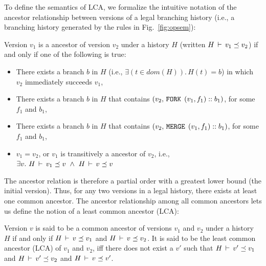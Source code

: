 To define the semantics of LCA, we formalize the intuitive notation of
the ancestor relationship between versions of a legal branching
history (i.e., a branching history generated by the rules in
Fig.~\ref{fig:opsem}):

\begin{definition} 
Version $v_1$ is a ancestor of version $v_2$ under a history
$H$ (written $H\,\vdash\,v_1 \preceq v_2$) if and only if one of the
following is true:
\begin{itemize}
  \item There exists a branch $b$ in $H$ (i.e., $\exists(t\in
  dom(H)).\,H(t) = b$) in which $v_2$ immediately succeeds
  $v_1$,
  \item There exists a branch $b$ in $H$ that contains $(v_2, 
  \,{\tt FORK}\,\; (v_1,f_1)::b_1)$, for some $f_1$ and $b_1$,
  \item There exists a branch $b$ in $H$ that contains
  $(v_2, \,{\tt MERGE}\,\;(v_1,f_1)::b_1)$, for some $f_1$ and $b_1$,
  \item $v_1 = v_2$, or $v_1$ is transitively a ancestor of
  $v_2$, i.e., $\exists v.~ H\,\vdash\,v_1 \preceq v ~\wedge~
  H\,\vdash\,v \preceq v$ 
\end{itemize}
\end{definition}

The ancestor relation is therefore a partial order with a greatest
lower bound (the initial version).  Thus, for any two versions in a
legal history, there exists at least one common ancestor.  The ancestor
relationship among all common ancestors lets us define the notion of a
least common ancestor (LCA):

\begin{definition} 
Version $v$ is said to be a common ancestor of versions $v_1$ and
$v_2$ under a history $H$ if and only if $H\,\vdash\,v \preceq v_1$
and $H\,\vdash\,v \preceq v_2$. It is said to be the least common
ancestor (LCA) of $v_1$ and $v_2$, iff there does not exist a $v'$
such that $H\,\vdash\,v' \preceq v_1$ and $H\,\vdash\,v' \preceq v_2$
and $H\,\vdash\,v \preceq v'$.
\end{definition}

